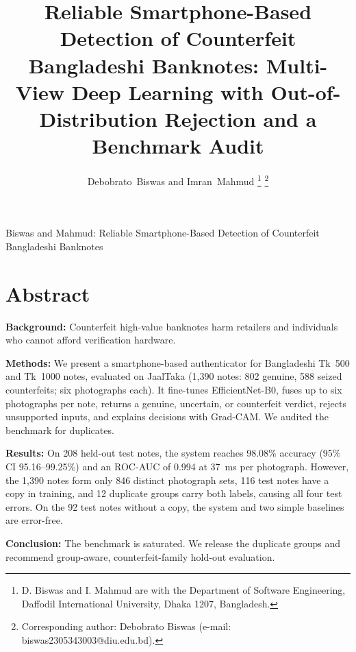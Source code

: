 \documentclass[journal,onecolumn]{IEEEtran}
\begin{document}
\title{Reliable Smartphone-Based Detection of Counterfeit Bangladeshi Banknotes:
Multi-View Deep Learning with Out-of-Distribution Rejection and a Benchmark Audit}

\author{Debobrato~Biswas and Imran~Mahmud%
\thanks{D. Biswas and I. Mahmud are with the Department of Software Engineering,
Daffodil International University, Dhaka 1207, Bangladesh.}%
\thanks{Corresponding author: Debobrato Biswas (e-mail: biswas2305343003@diu.edu.bd).}}

%
{Biswas and Mahmud: Reliable Smartphone-Based Detection of Counterfeit Bangladeshi Banknotes}

\maketitle

\section*{Abstract}
\noindent\textbf{Background:} Counterfeit high-value banknotes harm retailers and
individuals who cannot afford verification hardware.

\noindent\textbf{Methods:} We present a smartphone-based authenticator for Bangladeshi
Tk~500 and Tk~1000 notes, evaluated on JaalTaka (1{,}390 notes: 802 genuine, 588 seized
counterfeits; six photographs each). It fine-tunes EfficientNet-B0, fuses up to six
photographs per note, returns a genuine, uncertain, or counterfeit verdict, rejects
unsupported inputs, and explains decisions with Grad-CAM. We audited the benchmark for
duplicates.

\noindent\textbf{Results:} On 208 held-out test notes, the system reaches 98.08\%
accuracy (95\% CI 95.16--99.25\%) and an ROC-AUC of 0.994 at 37~ms per photograph.
However, the 1{,}390 notes form only 846 distinct photograph sets, 116 test notes have a
copy in training, and 12 duplicate groups carry both labels, causing all four test
errors. On the 92 test notes without a copy, the system and two simple baselines are
error-free.

\noindent\textbf{Conclusion:} The benchmark is saturated. We release the duplicate
groups and recommend group-aware, counterfeit-family hold-out evaluation.
\end{document}

